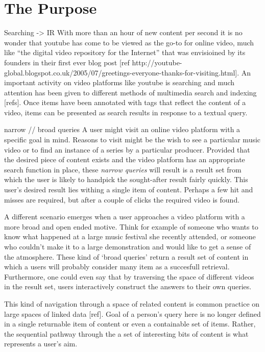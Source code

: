 \section{The Purpose}

Searching -> IR
With more than an hour of new content per second it is no wonder that youtube has come to be viewed as the go-to for online video, much like  ``the digital video repository for the Internet'' that was envisioined by its founders in their first ever blog post [ref http://youtube-global.blogspot.co.uk/2005/07/greetings-everyone-thanks-for-visiting.html]. An important activity on video platforms like youtube is searching and much attention has been given to different methods of multimedia search and indexing [refs]. Once items have been annotated with tags that reflect the content of a video, items can be presented as search results in response to a textual query.

narrow // broad queries
A user might visit an online video platform with a specific goal in mind. Reasons to visit might be the wish to see a particular music video or to find an instance of a series by a particular producer. Provided that the desired piece of content exists and the video platform has an appropriate search function in place, these \textit{narrow queries} will result is a result set from which the user is likely to handpick the sought-after result fairly quickly. This user's desired result lies withing a single item of content. Perhaps a few hit and misses are required, but after a couple of clicks the required video is found.

A different scenario emerges when a user approaches a video platform with a more broad and open ended motive. Think for example of someone who wants to know what happened at a large music festival she recently attended, or someone who couldn't make it to a large demonstration and would like to get a sense of the atmosphere. These kind of `broad queries' return a result set of content in which a users will probably consider many item as a succesfull retrieval. Furthermore, one could even say that by traversing the space of different videos in the result set, users interactively construct the answers to their own queries.

This kind of navigation through a space of related content is common practice on large spaces of linked data [ref]. Goal of a person's query here is no longer defined in a single returnable item of content or even a containable set of items. Rather, the sequential pathway through the a set of interesting bits of content is what represents a user's aim. 

